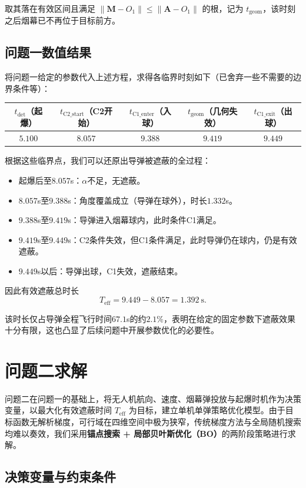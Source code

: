 \documentclass{ctexart}
\begin{document}
取其落在有效区间且满足 $\|\mathbf{M}-O_1\| \le \|\mathbf{A}-O_1\|$ 的根，记为 $t_{\text{geom}}$，该时刻之后烟幕已不再位于目标前方。

\subsection{问题一数值结果}
将问题一给定的参数代入上述方程，求得各临界时刻如下（已舍弃一些不需要的边界条件等）：
\begin{center}
\begin{tabular}{c|c|c|c|c}
\toprule
$t_{\text{det}}$（起爆）& $t_{\text{C2\_start}}$（C2开始）& $t_{\text{C1\_enter}}$（入球）& $t_{\text{geom}}$（几何失效）& $t_{\text{C1\_exit}}$（出球）\\
\midrule
$5.100$ & $8.057$ & $9.388$ & $9.419$ & $9.449$ \\
\bottomrule
\end{tabular}
\end{center}

根据这些临界点，我们可以还原出导弹被遮蔽的全过程：
\begin{itemize}
    \item 起爆后至$8.057$s：$\alpha$不足，无遮蔽。
    \item $8.057$s至$9.388$s：角度覆盖成立（导弹在球外），时长$1.332$s。
    \item $9.388$s至$9.419$s：导弹进入烟幕球内，此时条件C1满足。
    \item $9.419$s至$9.449$s：C2条件失效，但C1条件满足，此时导弹仍在球内，仍是有效遮蔽。
    \item $9.449$s以后：导弹出球，C1失效，遮蔽结束。
\end{itemize}
因此有效遮蔽总时长
\[
T_{\text{eff}} =9.449-8.057= 1.392\ \mathrm{s}.
\]

该时长仅占导弹全程飞行时间$67.1$s的约$2.1\%$，表明在给定的固定参数下遮蔽效果十分有限，这也凸显了后续问题中开展参数优化的必要性。
\section{问题二求解}

问题二在问题一的基础上，将无人机航向、速度、烟幕弹投放与起爆时机作为决策变量，以最大化有效遮蔽时间 $T_{\text{eff}}$ 为目标，建立单机单弹策略优化模型。由于目标函数无解析梯度，可行域在四维空间中极为狭窄，传统梯度方法与全局随机搜索均难以奏效，我们采用\textbf{锚点搜索 + 局部贝叶斯优化（BO）}的两阶段策略进行求解。

\subsection{决策变量与约束条件}
\end{document}
